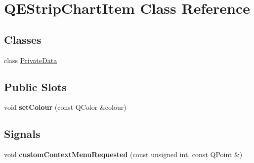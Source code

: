 \hypertarget{classQEStripChartItem}{
\section{QEStripChartItem Class Reference}
\label{classQEStripChartItem}
}
\subsection*{Classes}
\begin{DoxyCompactItemize}
\item 
class \hyperlink{classQEStripChartItem_1_1PrivateData}{PrivateData}
\end{DoxyCompactItemize}
\subsection*{Public Slots}
\begin{DoxyCompactItemize}
\item 
\hypertarget{classQEStripChartItem_a3ffa3cae21752e04ffdc41ecb609f726}{
void {\bfseries setColour} (const QColor \&colour)}
\label{classQEStripChartItem_a3ffa3cae21752e04ffdc41ecb609f726}

\end{DoxyCompactItemize}
\subsection*{Signals}
\begin{DoxyCompactItemize}
\item 
\hypertarget{classQEStripChartItem_a4c2a3323ff1c821d8c2b115b725f5dd8}{
void {\bfseries customContextMenuRequested} (const unsigned int, const QPoint \&)}
\label{classQEStripChartItem_a4c2a3323ff1c821d8c2b115b725f5dd8}

\end{DoxyCompactItemize}

